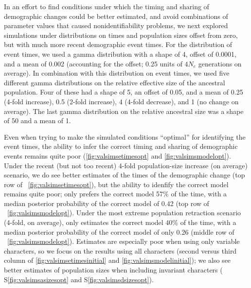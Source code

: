 In an effort to find conditions under which the timing and sharing of
demographic changes could be better estimated, and avoid combinations
of parameter values that caused nonidentifiability problems,
we next explored simulations under distributions on times and population sizes
offset from zero, but with much more recent demographic event times.
For the distribution of event times, we used a gamma distribution
with a shape of 4, offset of 0.0001, and a mean of 0.002 (accounting
for the offset; 0.25 units of $4N_e$ generations on average).
In combination with this distribution on event times,
we used five different gamma distributions on the relative
effective size of the ancestral population.
Four of these had a shape of 5, an offset of 0.05, and a mean
of
0.25 (4-fold increase),
0.5 (2-fold increase),
4 (4-fold decrease),
and
1 (no change on average).
The last gamma distribution on the relative ancestral size was a shape of 50
and a mean of 1.

Even when trying to make the simulated conditions ``optimal'' for identifying
the event times, the ability to infer the correct timing and sharing of
demographic events remains quite poor
(\figs \ref{fig:valsimsetimesopt} and \ref{fig:valsimsmodelopt}).
Under the recent (but not too recent) 4-fold population-size increase (on
average) scenario, we do see better estimates of the times of the demographic
change
(top row of \fig{}~\ref{fig:valsimsetimesopt}),
but the ability to idenfify the correct model remains quite poor;
\ecoevolity only prefers the correct model 57\% of the time, with
a median posterior probability of the correct model of 0.42
(top row of \fig{}~\ref{fig:valsimsmodelopt}).
Under the most extreme population retraction scenario (4-fold, on average),
\ecoevolity only estimates the correct model 40\% of the time, with a median
posterior probability of the correct model of only 0.26
(middle row of \fig{}~\ref{fig:valsimsmodelopt}).
Estimates are especially poor when using only variable characters,
so we focus on the results using all characters
(second versus third column of \figs
\ref{fig:valsimsetimesinitial}
and
\ref{fig:valsimsmodelinitial});
we also see better estimates of population sizes when including invariant
characters
(\figs
S\ref{fig:valsimsasizesopt}
and 
S\ref{fig:valsimsdsizesopt}).

